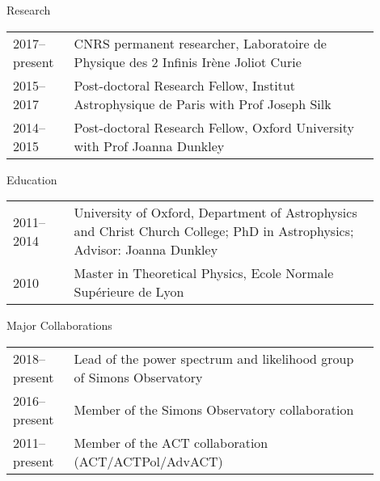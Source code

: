 \documentclass{resume} %
\begin{document}
\begin{rSection}{Research}
\vspace{-0.4cm}
\begin{table}[h]
{\def\arraystretch{1.5}\tabcolsep=0pt
\begin{tabular}{p{0.15\linewidth}p{0.75\linewidth}}
  2017--present & CNRS permanent researcher, Laboratoire de Physique des 2 Infinis Irène Joliot Curie \\
  2015--2017 & Post-doctoral Research Fellow, Institut Astrophysique de Paris with Prof Joseph Silk \\
  2014--2015 & Post-doctoral Research Fellow, Oxford University with Prof Joanna Dunkley \\
\end{tabular}%
}
\end{table}
\end{rSection}
\vspace{-0.6cm}


\begin{rSection}{Education}
\vspace{-0.4cm}
\begin{table}[h]
{\def\arraystretch{1.5}\tabcolsep=0pt
\begin{tabular}{p{0.15\linewidth}p{0.75\linewidth}}

2011--2014 & University of Oxford, Department of Astrophysics and Christ Church College;
PhD in Astrophysics;	Advisor: Joanna Dunkley \\
2010 & Master in Theoretical Physics, Ecole Normale Supérieure de Lyon \\

\end{tabular}%
}
\end{table}
\end{rSection}
\vspace{-0.6cm}

\begin{rSection}{Major Collaborations}
\vspace{-0.4cm}
\begin{table}[h]
{\def\arraystretch{1.5}\tabcolsep=0pt
\begin{tabular}{p{0.15\linewidth}p{0.75\linewidth}}
2018--present & Lead of the power spectrum and likelihood group of Simons Observatory \\
2016--present & Member of the Simons Observatory collaboration \\
2011--present & Member of the ACT collaboration (ACT/ACTPol/AdvACT) \\
\end{tabular}%
}
\end{table}
\end{rSection}
\end{document}
